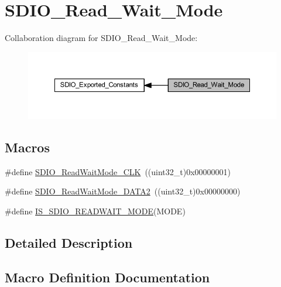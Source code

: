 \hypertarget{group___s_d_i_o___read___wait___mode}{}\section{S\+D\+I\+O\+\_\+\+Read\+\_\+\+Wait\+\_\+\+Mode}
\label{group___s_d_i_o___read___wait___mode}
Collaboration diagram for S\+D\+I\+O\+\_\+\+Read\+\_\+\+Wait\+\_\+\+Mode\+:
\nopagebreak
\begin{figure}[H]
\begin{center}
\leavevmode
\includegraphics[width=350pt]{group___s_d_i_o___read___wait___mode}
\end{center}
\end{figure}
\subsection*{Macros}
\begin{DoxyCompactItemize}
\item 
\#define \hyperlink{group___s_d_i_o___read___wait___mode_ga5d73b50fed8b2589f337a6301f22f41c}{S\+D\+I\+O\+\_\+\+Read\+Wait\+Mode\+\_\+\+C\+LK}~((uint32\+\_\+t)0x00000001)
\item 
\#define \hyperlink{group___s_d_i_o___read___wait___mode_ga3d6952d82468b49dcc7abd5b9e02039f}{S\+D\+I\+O\+\_\+\+Read\+Wait\+Mode\+\_\+\+D\+A\+T\+A2}~((uint32\+\_\+t)0x00000000)
\item 
\#define \hyperlink{group___s_d_i_o___read___wait___mode_ga35144093f5b3553a62c2248896eead4d}{I\+S\+\_\+\+S\+D\+I\+O\+\_\+\+R\+E\+A\+D\+W\+A\+I\+T\+\_\+\+M\+O\+DE}(M\+O\+DE)
\end{DoxyCompactItemize}


\subsection{Detailed Description}


\subsection{Macro Definition Documentation}
\mbox{\label{group___s_d_i_o___read___wait___mode_ga35144093f5b3553a62c2248896eead4d}} 
